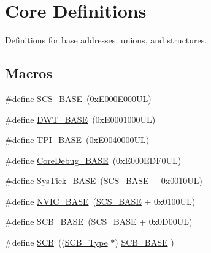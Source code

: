 \hypertarget{group___c_m_s_i_s__core__base}{}\section{Core Definitions}
\label{group___c_m_s_i_s__core__base}


Definitions for base addresses, unions, and structures.  


\subsection*{Macros}
\begin{DoxyCompactItemize}
\item 
\#define \mbox{\hyperlink{group___c_m_s_i_s__core__base_ga3c14ed93192c8d9143322bbf77ebf770}{S\+C\+S\+\_\+\+B\+A\+SE}}~(0x\+E000\+E000\+U\+L)
\item 
\#define \mbox{\hyperlink{group___c_m_s_i_s__core__base_gafdab534f961bf8935eb456cb7700dcd2}{D\+W\+T\+\_\+\+B\+A\+SE}}~(0x\+E0001000\+U\+L)
\item 
\#define \mbox{\hyperlink{group___c_m_s_i_s__core__base_ga2b1eeff850a7e418844ca847145a1a68}{T\+P\+I\+\_\+\+B\+A\+SE}}~(0x\+E0040000\+U\+L)
\item 
\#define \mbox{\hyperlink{group___c_m_s_i_s__core__base_ga680604dbcda9e9b31a1639fcffe5230b}{Core\+Debug\+\_\+\+B\+A\+SE}}~(0x\+E000\+E\+D\+F0\+U\+L)
\item 
\#define \mbox{\hyperlink{group___c_m_s_i_s__core__base_ga58effaac0b93006b756d33209e814646}{Sys\+Tick\+\_\+\+B\+A\+SE}}~(\mbox{\hyperlink{group___c_m_s_i_s__core__base_ga3c14ed93192c8d9143322bbf77ebf770}{S\+C\+S\+\_\+\+B\+A\+SE}} +  0x0010\+U\+L)
\item 
\#define \mbox{\hyperlink{group___c_m_s_i_s__core__base_gaa0288691785a5f868238e0468b39523d}{N\+V\+I\+C\+\_\+\+B\+A\+SE}}~(\mbox{\hyperlink{group___c_m_s_i_s__core__base_ga3c14ed93192c8d9143322bbf77ebf770}{S\+C\+S\+\_\+\+B\+A\+SE}} +  0x0100\+U\+L)
\item 
\#define \mbox{\hyperlink{group___c_m_s_i_s__core__base_gad55a7ddb8d4b2398b0c1cfec76c0d9fd}{S\+C\+B\+\_\+\+B\+A\+SE}}~(\mbox{\hyperlink{group___c_m_s_i_s__core__base_ga3c14ed93192c8d9143322bbf77ebf770}{S\+C\+S\+\_\+\+B\+A\+SE}} +  0x0\+D00\+U\+L)
\item 
\#define \mbox{\hyperlink{group___c_m_s_i_s__core__base_gaaaf6477c2bde2f00f99e3c2fd1060b01}{S\+CB}}~((\mbox{\hyperlink{struct_s_c_b___type}{S\+C\+B\+\_\+\+Type}}       $\ast$)     \mbox{\hyperlink{group___c_m_s_i_s__core__base_gad55a7ddb8d4b2398b0c1cfec76c0d9fd}{S\+C\+B\+\_\+\+B\+A\+SE}}         )

\end{DoxyCompactItemize}
